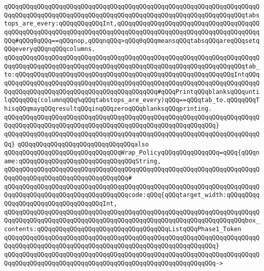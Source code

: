 \verb|qQQqqQQqqQQqqQQqqQQqqQQqqQQqqQQqqQQqqQQqqQQqqQQqqQQqqQQqqQQqqQQqqQQqqQQqqQQqqQQqqQQqqQQqqQQqqQQqqQQqqQQqqQQqqQQqqQQqqQQqqQQqqQQqqQQqqQQqtabstops_are_every:qQQqqQQqqQQqInt,qQQqqQQqqQQqqQQqqQQqqQQqqQQqqQQqqQQqqQQqqQQqqQQqqQQqqQQqqQQqqQQqqQQqqQQqqQQqqQQqqQQqqQQqqQQqqQQqqQQqqQQqqQQqqQQq#qQQq0qQQq==qQQqnop,qQQqnqQQq>qQQq0qQQqmeansqQQqtabsqQQqareqQQqsetqQQqeveryqQQqnqQQqcolumns.|\newline
\verb|qQQqqQQqqQQqqQQqqQQqqQQqqQQqqQQqqQQqqQQqqQQqqQQqqQQqqQQqqQQqqQQqqQQqqQQqqQQqqQQqqQQqqQQqqQQqqQQqqQQqqQQqqQQqqQQqqQQqqQQqqQQqqQQqqQQqqQQqtab_to:qQQqqQQqqQQqqQQqqQQqqQQqqQQqqQQqqQQqqQQqqQQqqQQqqQQqqQQqqQQqIntqQQqqQQqqQQqqQQqqQQqqQQqqQQqqQQqqQQqqQQqqQQqqQQqqQQqqQQqqQQqqQQqqQQqqQQqqQQqqQQqqQQqqQQqqQQqqQQqqQQqqQQqqQQqqQQqqQQq#qQQqPrintqQQqblanksqQQquntilqQQqqQQq(columnqQQq%qQQqtabstops_are_every)qQQq==qQQqtab_to.qQQqqQQqThisqQQqmayqQQqresultqQQqinqQQqzeroqQQqblanksqQQqprinting.|\newline
\verb|qQQqqQQqqQQqqQQqqQQqqQQqqQQqqQQqqQQqqQQqqQQqqQQqqQQqqQQqqQQqqQQqqQQqqQQqqQQqqQQqqQQqqQQqqQQqqQQqqQQqqQQqqQQqqQQqqQQqqQQqqQQqqQQq}|\newline
\verb|qQQqqQQqqQQqqQQqqQQqqQQqqQQqqQQqqQQqqQQqqQQqqQQqqQQqqQQqqQQqqQQqqQQqqQQq}|\newline
\newline
\verb|qQQqqQQqqQQqqQQqqQQqqQQqqQQqqQQqalso|\newline
\verb|qQQqqQQqqQQqqQQqqQQqqQQqqQQqqQQqWrap_PolicyqQQqqQQqqQQqqQQq=qQQq{qQQqname:qQQqqQQqqQQqqQQqqQQqqQQqqQQqqQQqString,|\newline
\verb|qQQqqQQqqQQqqQQqqQQqqQQqqQQqqQQqqQQqqQQqqQQqqQQqqQQqqQQqqQQqqQQqqQQqqQQqqQQqqQQqqQQqqQQqqQQqqQQqqQQqqQQq#|\newline
\verb|qQQqqQQqqQQqqQQqqQQqqQQqqQQqqQQqqQQqqQQqqQQqqQQqqQQqqQQqqQQqqQQqqQQqqQQqqQQqqQQqqQQqqQQqqQQqqQQqqQQqqQQqcode:qQQq{qQQqtarget_width:qQQqqQQqqQQqqQQqqQQqqQQqqQQqqQQqqQQqInt,|\newline
\verb|qQQqqQQqqQQqqQQqqQQqqQQqqQQqqQQqqQQqqQQqqQQqqQQqqQQqqQQqqQQqqQQqqQQqqQQqqQQqqQQqqQQqqQQqqQQqqQQqqQQqqQQqqQQqqQQqqQQqqQQqqQQqqQQqqQQqqQQqbox_contents:qQQqqQQqqQQqqQQqqQQqqQQqqQQqqQQqqQQqListqQQqPhase1_Token|\newline
\verb|qQQqqQQqqQQqqQQqqQQqqQQqqQQqqQQqqQQqqQQqqQQqqQQqqQQqqQQqqQQqqQQqqQQqqQQqqQQqqQQqqQQqqQQqqQQqqQQqqQQqqQQqqQQqqQQqqQQqqQQqqQQqqQQq}|\newline
\verb|qQQqqQQqqQQqqQQqqQQqqQQqqQQqqQQqqQQqqQQqqQQqqQQqqQQqqQQqqQQqqQQqqQQqqQQqqQQqqQQqqQQqqQQqqQQqqQQqqQQqqQQqqQQqqQQqqQQqqQQqqQQqqQQq->|\newline
